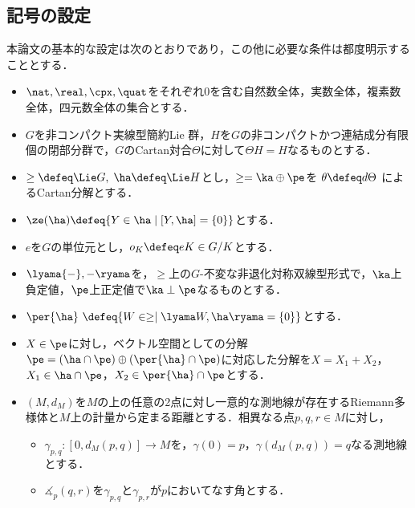 
\newcommand*\ccircled[4]{\tikz[baseline=(char.base)]{
    \node[shape=circle, fill=#2, draw=#3, text=#4, inner sep=1pt] (char) {#1};}}
\newcommand{\cnum}[1]{\ccircled{#1}{MediumTurquoise!40}{MediumTurquoise!40}{black}}

\subsection{記号の設定}
本論文の基本的な設定は次のとおりであり，この他に必要な条件は都度明示することとする．

\begin{nttdef}\label{nttdef:fund}
  \leavevmode\vspace{-1em}
  \begin{itemize}
  \item $\nat,\real, \cpx,\quat$をそれぞれ0を含む自然数全体，実数全体，複素数全体，四元数全体の集合とする．
  \item $G$を非コンパクト実線型簡約Lie 群，$H$を$G$の非コンパクトかつ連結成分有限個の閉部分群で，$G$のCartan対合$\Theta$に対して$\Theta H = H$なるものとする．
  \item $\ge \defeq \Lie G,\; \ha \defeq \Lie H$とし，$\ge = \ka\oplus \pe$を $\theta \defeq d\Theta$ によるCartan分解とする．
  \item $\ze(\ha)\defeq \{Y\in \ha\mid [Y,\ha] = \{0\} \} $とする．
  \item $e$を$G$の単位元とし，$o_K \defeq eK\in G/K$とする．
  \item $\lyama{-},{-} \ryama$を，$\ge$上の$G$-不変な非退化対称双線型形式で，$\ka$上負定値，$\pe$上正定値で$\ka\perp \pe$なるものとする．
  \item $\per{\ha}\ \defeq \{W\in \ge\mid \lyama W, \ha\ryama = \{0\}\} $とする．
  \item $X\in \pe$に対し，ベクトル空間としての分解$\pe =( \ha\cap \pe)\oplus(\per{\ha}\cap \pe) $に対応した分解を$X = X_1 + X_2 $，$X_1 \in \ha\cap \pe$，$X_2\in \per{\ha}\cap \pe$とする．
  \item $(M,d_M)$を$M$の上の任意の2点に対し一意的な測地線が存在するRiemann多様体と$M$上の計量から定まる距離とする．相異なる点$p,q,r \in M$に対し，
    \begin{itemize}
    \item $\gamma_{p,q}\colon [0, d_{M}(p,q)] \to M$を，$\gamma(0) =  p$，$\gamma(d_{M}(p,q)) = q $なる測地線とする．
    \item $\measuredangle_{p}(q, r)$を$\gamma_{p,q} $と$\gamma_{p,r} $が$p$においてなす角とする．
    \end{itemize}
  \end{itemize}  
\end{nttdef}

